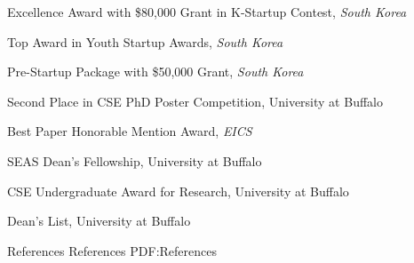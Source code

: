 \documentclass[letterpaper,MMMyyyy,nonstopmode]{simpleresumecv}
\begin{document}
\begin{Body}
\BulletItem
Excellence Award with \$80,000 Grant in K-Startup Contest, \textit{South Korea}
\hfill
{}
\vspace{0.5ex}

\BulletItem
Top Award in Youth Startup Awards, \textit{South Korea}
\hfill
{}
\vspace{0.5ex}

\BulletItem
Pre-Startup Package with \$50,000 Grant, \textit{South Korea} 
\hfill
{}
\vspace{0.5ex}

\BulletItem
Second Place in CSE PhD Poster Competition, University at Buffalo
\hfill
{}

\vspace{0.5ex}


\BulletItem
Best Paper Honorable Mention Award, \textit{EICS}
\hfill
{}
\vspace{0.5ex}

\Gap
\BulletItem
SEAS Dean’s Fellowship, University at Buffalo
\hfill
{}

\vspace{0.5ex}

\Gap
\BulletItem
CSE Undergraduate Award for Research, University at Buffalo
\hfill
{}

\vspace{0.5ex}

\Gap
\BulletItem
Dean's List, University at Buffalo
\hfill
{}







\vspace{-0.5ex}
\Section
{References}
{References}
{PDF:References}


\end{Body}
\end{document}
